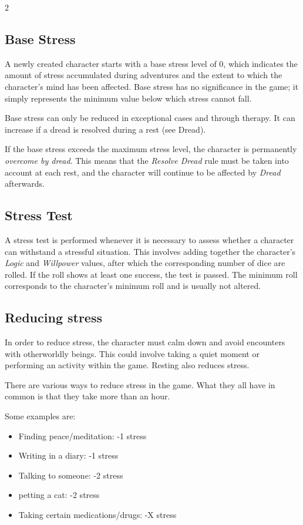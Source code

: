 \begin{multicols}{2}
\subsection{Base Stress}

A newly created character starts with a base stress level of 0, which indicates the amount of stress accumulated during adventures and the extent to which the character's mind has been affected. Base stress has no significance in the game; it simply represents the minimum value below which stress cannot fall.

Base stress can only be reduced in exceptional cases and through therapy. It can increase if a dread is resolved during a rest (see Dread).

If the base stress exceeds the maximum stress level, the character is permanently \textit{overcome by dread}. This means that the \textit{Resolve Dread} rule must be taken into account at each rest, and the character will continue to be affected by \textit{Dread} afterwards.

\subsection{Stress Test}

A stress test is performed whenever it is necessary to assess whether a character can withstand a stressful situation. This involves adding together the character's \textit{Logic} and \textit{Willpower} values, after which the corresponding number of dice are rolled. If the roll shows at least one success, the test is passed. The minimum roll corresponds to the character's minimum roll and is usually not altered.

\subsection{Reducing stress}

In order to reduce stress, the character must calm down and avoid encounters with otherworldly beings. This could involve taking a quiet moment or performing an activity within the game. Resting also reduces stress.

There are various ways to reduce stress in the game. What they all have in common is that they take more than an hour.

Some examples are:
\begin{itemize}
    \item Finding peace/meditation: -1 stress
    \item Writing in a diary: -1 stress
    \item Talking to someone: -2 stress
    \item petting a cat: -2 stress
    \item Taking certain medications/drugs: -X stress
\end{itemize}


\end{multicols}

